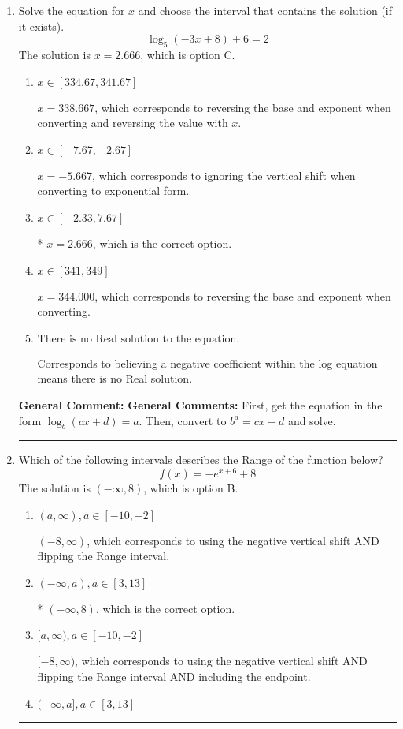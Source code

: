 \documentclass{extbook}[14pt]
\newcommand{\litem}[1]{\item #1

\rule{\textwidth}{0.4pt}}
\begin{document}
\begin{enumerate}\litem{
Solve the equation for $x$ and choose the interval that contains the solution (if it exists).
\[ \log_{5}{(-3x+8)}+6 = 2 \]The solution is \( x = 2.666 \), which is option C.\begin{enumerate}[label=\Alph*.]
\item \( x \in [334.67, 341.67] \)

$x = 338.667$, which corresponds to reversing the base and exponent when converting and reversing the value with $x$.
\item \( x \in [-7.67, -2.67] \)

$x = -5.667$, which corresponds to ignoring the vertical shift when converting to exponential form.
\item \( x \in [-2.33, 7.67] \)

* $x = 2.666$, which is the correct option.
\item \( x \in [341, 349] \)

$x = 344.000$, which corresponds to reversing the base and exponent when converting.
\item \( \text{There is no Real solution to the equation.} \)

Corresponds to believing a negative coefficient within the log equation means there is no Real solution.
\end{enumerate}

\textbf{General Comment:} \textbf{General Comments:} First, get the equation in the form $\log_b{(cx+d)} = a$. Then, convert to $b^a = cx+d$ and solve.
}
\litem{
Which of the following intervals describes the Range of the function below?
\[ f(x) = -e^{x+6}+8 \]The solution is \( (-\infty, 8) \), which is option B.\begin{enumerate}[label=\Alph*.]
\item \( (a, \infty), a \in [-10, -2] \)

$(-8, \infty)$, which corresponds to using the negative vertical shift AND flipping the Range interval.
\item \( (-\infty, a), a \in [3, 13] \)

* $(-\infty, 8)$, which is the correct option.
\item \( [a, \infty), a \in [-10, -2] \)

$[-8, \infty)$, which corresponds to using the negative vertical shift AND flipping the Range interval AND including the endpoint.
\item \( (-\infty, a], a \in [3, 13] \)


\end{enumerate}}
\end{enumerate}
\end{document}
